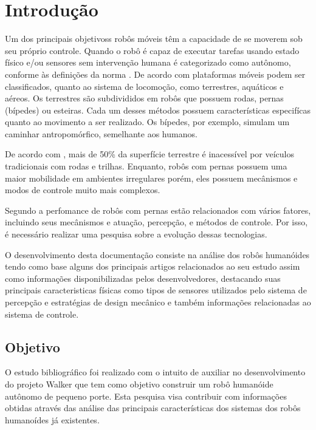 \chapter{Introdução}
\label{chap:intro}

Um dos principais objetivoss robôs móveis têm a capacidade de se moverem sob seu próprio controle. Quando o robô é capaz de executar tarefas usando estado físico e/ou sensores sem intervenção humana é categorizado como autônomo, conforme às definições da norma \cite{ISO}. De acordo com  plataformas móveis podem ser classificados, quanto ao sistema de locomoção, como terrestres, aquáticos e aéreos. Os terrestres são subdivididos em robôs que possuem rodas, pernas (bípedes) ou esteiras. Cada um desses métodos possuem características especifícas quanto ao movimento a ser realizado. Os bípedes, por exemplo, simulam um caminhar antropomórfico, semelhante aos humanos. 

De acordo com , mais de 50\% da superfície terrestre é inacessível por veículos tradicionais com rodas e trilhas. Enquanto, robôs com pernas possuem uma maior mobilidade em ambientes irregulares porém, eles possuem mecânismos e modos de controle muito mais complexos.\cite{Wieber20161203}

Segundo  a perfomance de robôs com pernas estão relacionados com vários fatores, incluindo seus mecânismos e atuação, percepção, e métodos de controle. Por isso, é necessário realizar uma pesquisa sobre a evolução dessas tecnologias.

O desenvolvimento desta documentação consiste na análise dos robôs humanóides tendo como base alguns dos principais artigos relacionados ao seu estudo assim como informações disponibilizadas pelos desenvolvedores, destacando suas principais caracteristicas físicas como tipos de sensores utilizados pelo sistema de percepção e estratégias de design mecânico e também informações relacionadas ao sistema de controle.

\section{Objetivo}
\label{sec:obj}

O estudo bibliográfico foi realizado com o intuito de auxiliar no desenvolvimento do projeto Walker que tem como objetivo construir um robô humanóide autônomo de pequeno porte. Esta pesquisa visa contribuir com informações obtidas através das análise das principais características dos sistemas dos robôs humanoídes já existentes. 

